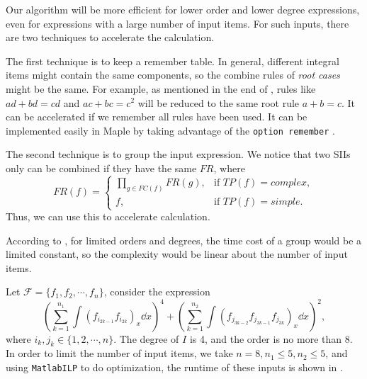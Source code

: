 Our algorithm will be more efficient for lower order and lower degree expressions, even for expressions with a large number of input items. For such inputs, there are two techniques to  accelerate the calculation.

The first technique is to keep a remember table. In general, different integral items might contain the same components, so the combine rules of \emph{root cases} might be the same. For example, as mentioned in the end of , rules like $ad+bd=cd$ and $ac+bc=c^2$ will be reduced to the same root rule $a+b=c$. It can be accelerated if we remember all rules have been used. It can be implemented easily in Maple by taking advantage of the \verb|option remember| \citep{maple_programming}. 

The second technique is to group the input expression. We notice that two SIIs only can be combined if they have the same $FR$, where
\begin{equation}    
FR(f)=\left\{
\begin{array}{cl}
\prod\limits_{g\in FC(f)}{FR(g)}, &\text{if }TP(f)=complex,\\ 
f,           &\text{if }TP(f)=simple.
\end{array}
\right.
\end{equation} 
Thus, we can use this to accelerate calculation. 

According to , for limited orders and degrees, the time cost of a group would be a limited constant, so the complexity would be linear about the number of input items.  

Let $\mathcal F=\{f_1,f_2,\cdots,f_n\}$, consider the expression
\begin{equation}
\left(\sum\limits_{k=1}^{n_1}{\int\!{(f_{i_{2k-1}}f_{i_{2k}})_x\dd x}}\right)^4+\left(\sum\limits_{k=1}^{n_2}{\int\!{(f_{j_{3k-2}}f_{j_{3k-1}}f_{j_{3k}})_x\dd x}}\right)^2,
\label{construct}
\end{equation}
where $i_k,j_k \in \{1,2,\cdots,n\}$. The degree of $I$ is 4, and the order is no more than 8. In order to limit the number of input items, we take $n=8,n_1\le 5,n_2\le 5$, and using \texttt{MatlabILP} to do optimization, the runtime of these inputs is shown in . 

